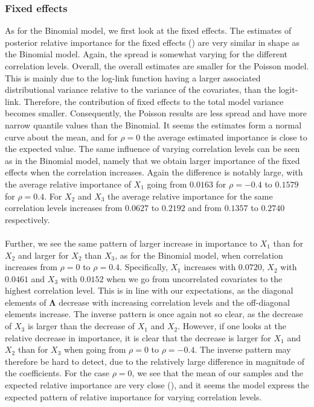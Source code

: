 \subsubsection{Fixed effects}
As for the Binomial model, we first look at the fixed effects. The estimates of posterior relative importance for the fixed effects () are very similar in shape as the Binomial model. Again, the spread is somewhat varying for the different correlation levels. Overall, the overall estimates are smaller for the Poisson model. This is mainly due to the log-link function having a larger associated distributional variance relative to the variance of the covariates, than the logit-link. Therefore, the contribution of fixed effects to the total model variance becomes smaller. Consequently, the Poisson results are less spread and have more narrow quantile values than the Binomial. It seems the estimates form a normal curve about the mean, and for $\rho=0$ the average estimated importance is close to the expected value. The same influence of varying correlation levels can be seen as in the Binomial model, namely that we obtain larger importance of the fixed effects when the correlation increases. Again the difference is notably large, with the average relative importance of $X_1$ going from $0.0163$ for $\rho=-0.4$ to $0.1579$ for $\rho=0.4$. For $X_2$ and $X_3$ the average relative importance for the same correlation levels increases from $0.0627$ to $0.2192$ and from $0.1357$ to $0.2740$ respectively.
\\
\\
Further, we see the same pattern of larger increase in importance to $X_1$ than for $X_2$ and larger for $X_2$ than $X_3$, as for the Binomial model, when correlation increases from $\rho=0$ to $\rho=0.4$. Specifically, $X_1$ increases with $0.0720$, $X_2$ with $0.0461$ and $X_3$ with $0.0152$ when we go from uncorrelated covariates to the highest correlation level. This is in line with our expectations, as the diagonal elements of $\boldsymbol{\Lambda}$ decrease with increasing correlation levels and the off-diagonal elements increase. The inverse pattern is once again not so clear, as the decrease of $X_3$ is larger than the decrease of $X_1$ and $X_2$. However, if one looks at the relative decrease in importance, it is clear that the decrease is larger for $X_1$ and $X_2$ than for $X_3$ when going from $\rho=0$ to $\rho=-0.4$. The inverse pattern may therefore be hard to detect, due to the relatively large difference in magnitude of the coefficients. For the case $\rho=0$, we see that the mean of our samples and the expected relative importance are very close (), and it seems the model express the expected pattern of relative importance for varying correlation levels.
